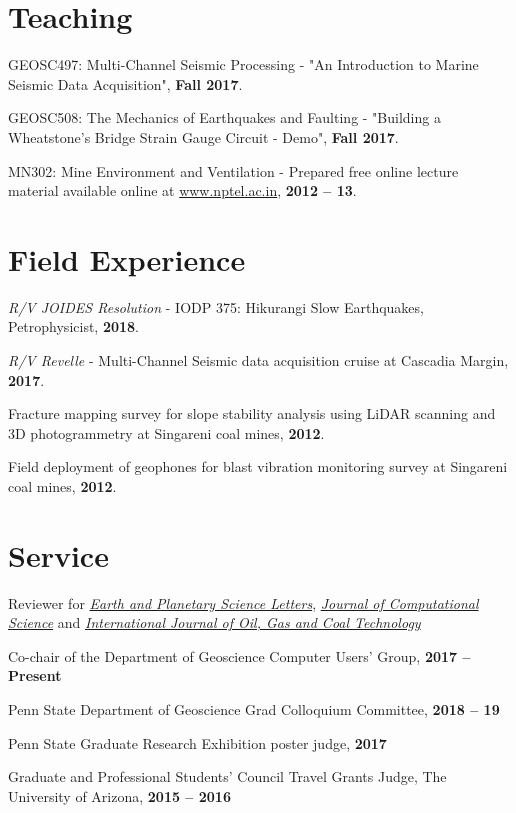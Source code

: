 \documentclass[11pt,letterpaper]{article}
\renewenvironment{itemize}{
  \begin{list}{}{
      \setlength{\leftmargin}{1.5em}
      \setlength{\itemsep}{0.25em}
      \setlength{\parskip}{0pt}
      \setlength{\parsep}{0.25em}
    }
}{
  \end{list}
}
\begin{document}


\section*{Teaching}
\begin{itemize}
    \item GEOSC497: Multi-Channel Seismic Processing - "An Introduction to Marine Seismic Data Acquisition", {\bf Fall 2017}.
    \item GEOSC508: The Mechanics of Earthquakes and Faulting - "Building a Wheatstone's Bridge Strain Gauge Circuit - Demo", {\bf Fall 2017}.
    \item MN302: Mine Environment and Ventilation - Prepared free online lecture material available online at \href{www.nptel.ac.in}{www.nptel.ac.in}, {\bf 2012 -- 13}.
\end{itemize}




\section*{Field Experience}
\begin{itemize}
    \item {\em R/V JOIDES Resolution} - IODP 375: Hikurangi Slow Earthquakes, Petrophysicist, {\bf  2018}. 
    \item {\em R/V Revelle} - Multi-Channel Seismic data acquisition cruise at Cascadia Margin, {\bf  2017}.
    \item Fracture mapping survey for slope stability analysis using LiDAR scanning and 3D photogrammetry at Singareni coal mines, {\bf  2012}.
    \item Field deployment of geophones for blast vibration monitoring survey at Singareni coal mines, {\bf  2012}.
\end{itemize}




\section*{Service}
\begin{itemize}
    \item Reviewer for \href{https://www.journals.elsevier.com/earth-and-planetary-science-letters}{\em Earth and Planetary Science Letters}, \href{https://www.journals.elsevier.com/journal-of-computational-science/}{\em Journal of Computational Science} and \href{http://www.inderscience.com/jhome.php?jcode=ijogct}{\em International Journal of Oil, Gas and Coal Technology}
    \item Co-chair of the Department of Geoscience Computer Users' Group, {\bf 2017 -- Present}
    \item Penn State Department of Geoscience Grad Colloquium Committee, {\bf 2018 -- 19}
    \item Penn State Graduate Research Exhibition poster judge, {\bf 2017}
    \item Graduate and Professional Students' Council Travel Grants Judge, The University of Arizona, {\bf 2015 -- 2016}
\end{itemize}
\end{document}

